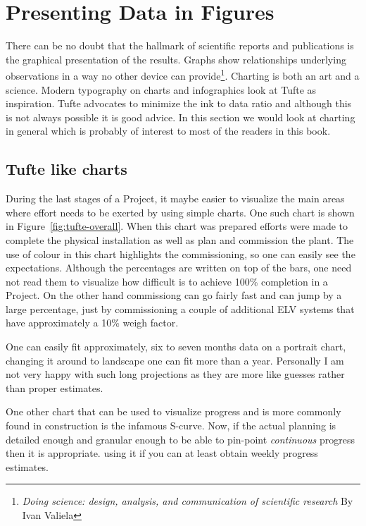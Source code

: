 \documentclass{scrbook}
\begin{document}
\chapter{Presenting Data in Figures}

There can be no doubt that the hallmark of scientific reports and publications is the graphical presentation of the results. Graphs show relationships underlying observations in a way no other device can provide\footnote{\textit{Doing science: design, analysis, and communication of scientific research}
 By Ivan Valiela}. 
Charting is both an art and a science. Modern typography on charts and infographics look at Tufte as inspiration.
Tufte advocates to minimize the ink to data ratio and although this is not always possible it is good advice.
In this section we would look at charting in general which is probably of interest to most of the readers
in this book. 

\section{Tufte like charts}

During the last stages of a Project, it maybe easier to visualize the
main areas where effort needs to be exerted by using simple charts. One
such chart is shown in Figure~\ref{fig:tufte-overall}. When this chart
was prepared efforts were made to complete the physical installation
as well as plan and commission the plant. The use of colour in this
chart highlights the commissioning, so one can easily see the expectations. Although the percentages are written on top of the bars,
one need not read them to visualize how difficult is to achieve
100\% completion in a Project. On the other hand commissiong can go
fairly fast and can jump by a large percentage, just by
commissioning a couple of additional ELV systems that have approximately
a 10\% weigh factor.

One can easily fit approximately, six to seven months data on
a portrait chart, changing it around to landscape one can fit
more than a year. Personally I am not very happy with such long
projections as they are more like guesses rather than proper estimates.

One other chart that can be used to visualize progress and is more
commonly found in construction is the infamous S-curve. Now, if
the actual planning is detailed enough and granular enough to be
able to pin-point \textit{continuous} progress then it is
appropriate. using it if you can at least obtain weekly progress
estimates.
\end{document}
